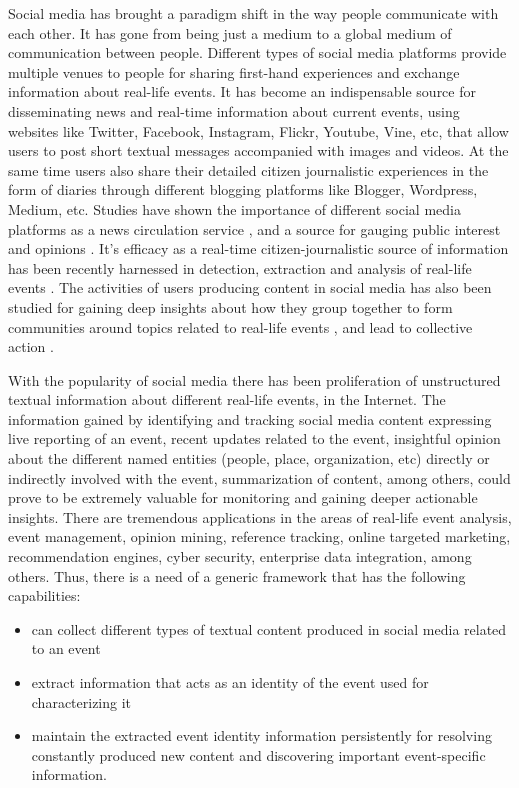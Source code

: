 \documentclass[12pt]{article}
\begin{document}
\maketitle

Social media has brought a paradigm shift in the way people communicate with each other. It has gone from being just a medium to a global medium of communication between people. Different types of social media platforms provide multiple venues to people for sharing first-hand experiences and exchange information about real-life events. It has become an indispensable source for disseminating news and real-time information about current events, using websites like Twitter, Facebook, Instagram, Flickr, Youtube, Vine, etc, that allow users to post short textual messages accompanied with images and videos. At the same time users also share their detailed citizen journalistic experiences in the form of diaries through different blogging platforms like Blogger, Wordpress, Medium, etc. Studies have shown the importance of different social media platforms as a news circulation service \cite{phelan2009using}, and a source for gauging public interest and opinions \cite{o2010tweets,singh2010clustering,singh2010mining,agarwal2012online}. It's efficacy as a real-time citizen-journalistic source of information has been recently harnessed in detection, extraction and analysis of real-life events \cite{sakaki2013tweet,popescu2011extracting,purohit2013twitris}. The activities of users producing content in social media has also been studied for gaining deep insights about how they group together to form communities around topics related to real-life events \cite{agarwal2013grouping,agarwal2014time,sen2012identifying}, and lead to collective action \cite{agarwal2014online,agarwal2012raising}.

With the popularity of social media there has been proliferation of unstructured textual information about different real-life events, in the Internet.
The information gained by identifying and tracking social media content expressing live reporting of an event, recent updates related to the event, insightful opinion about the different named entities (people, place, organization, etc) directly or indirectly involved with the event, summarization of content, among others, could prove to be extremely valuable for monitoring and gaining deeper actionable insights. There are tremendous applications in the areas of real-life event analysis, event management, opinion mining, reference tracking, online targeted marketing, recommendation engines, cyber security, enterprise data integration, among others. Thus, there is a need of a generic framework that has the following capabilities:
\begin{itemize}
\item can collect different types of textual content produced in social media related to an event
\item extract information that acts as an identity of the event used for characterizing it
\item maintain the extracted event identity information persistently for resolving constantly produced new content and discovering important event-specific information. 
\end{itemize}
\end{document}
